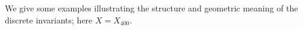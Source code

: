 \documentclass{amsart}
\begin{document}
\clearpage

\pagebreak


We give some examples illustrating the structure and geometric meaning of the discrete invariants; here \(X = X_{400}\).









 
\end{document}
